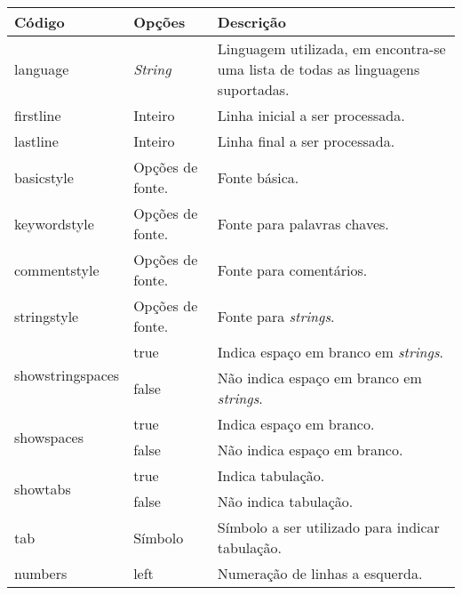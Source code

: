 % 
% 
% 
% 
% 
\begin{tabular}{llp{9cm}}
    \hline
    Código & Opções & Descrição \\ \hline
    \textsf{language} & \textit{String} & Linguagem utilizada, em \cite{Moses07} encontra-se uma lista de todas as linguagens suportadas. \\ \hline
    \textsf{firstline} & Inteiro & Linha inicial a ser processada. \\ \hline
    \textsf{lastline} & Inteiro & Linha final a ser processada. \\ \hline
    \textsf{basicstyle}& Opções de fonte. & Fonte básica. \\ \hline
    \textsf{keywordstyle} & Opções de fonte. &  Fonte para palavras chaves. \\ \hline
    \textsf{commentstyle} & Opções de fonte. & Fonte para comentários. \\ \hline
    \textsf{stringstyle} & Opções de fonte. & Fonte para \textit{strings}. \\ \hline
    \multirow{2}{*}{\textsf{showstringspaces}} & \textsf{true} & Indica espaço em branco em \textit{strings}. \\
    & \textsf{false} & Não indica espaço em branco em \textit{strings}. \\ \hline
    \multirow{2}{*}{\textsf{showspaces}} & \textsf{true} & Indica espaço em branco. \\
    & \textsf{false} & Não indica espaço em branco. \\ \hline
    \multirow{2}{*}{\textsf{showtabs}} & \textsf{true} & Indica tabulação. \\
    & \textsf{false} & Não indica tabulação. \\ \hline
    \textsf{tab} & Símbolo & Símbolo a ser utilizado para indicar tabulação. \\ \hline
    \multirow{2}{*}{\textsf{numbers}} & \textsf{left} & Numeração de linhas a esquerda. \\

\end{tabular}
